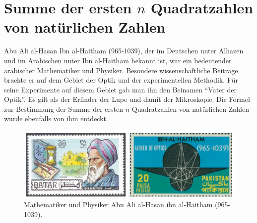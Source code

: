 %
%

\chapter{Summe der ersten $n$ Quadratzahlen von natürlichen Zahlen}

Abu Ali al-Hasan Ibn al-Haitham (965-1039), der im Deutschen unter
Alhazen und im Arabischen unter Ibn al-Haitham bekannt ist,
war ein bedeutender arabischer Mathematiker und Physiker.
Besondere wissenschaftliche Beiträge brachte er auf dem Gebiet
der Optik und der experimentellen Methodik.
Für seine Experimente auf diesem Gebiet gab man ihn den Beinamen
``Vater der Optik''. Es gilt als der Erfinder der Lupe und
damit der Mikroskopie. Die Formel zur Bestimmung der Summe der ersten
$n$ Quadratzahlen von natürlichen Zahlen wurde ebenfalls von
ihm entdeckt.

\begin{figure}[H]
  \centering
  \includegraphics[width=.5\linewidth]{./images/muster06.png}
  \caption[]{Mathematiker und Physiker Abu Ali al-Hasan ibn al-Haitham (965-1039).}
  \label{fig:abu_ali_al_Hasan_ahitham}
\end{figure}


